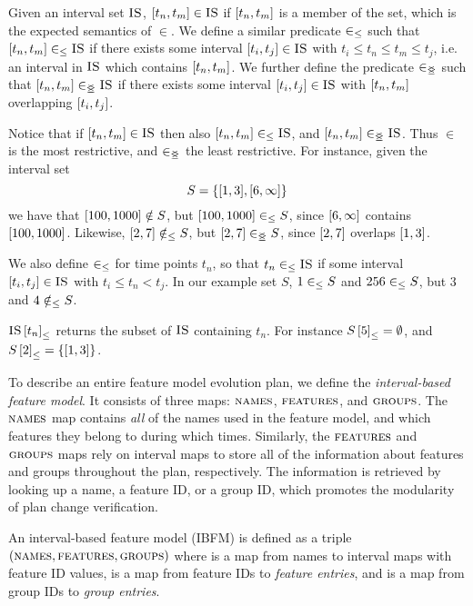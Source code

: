 Given an interval set $\textsc{IS}$, $\interval{t_n}{t_m} \in \map{IS}$ if $\interval{t_n}{t_m}$ is a member of the set, which is the expected semantics of $\in$. We define a similar predicate $\in_\leq$ such that $\interval{t_n}{t_m} \inn \map{IS}$ if there exists some interval $\interval{t_i}{t_j} \in \map{IS}$ with $t_i \leq t_n \leq t_m \leq t_j$, i.e. an interval in $\textsc{IS}$ which contains $\interval{t_n}{t_m}$. We further define the predicate $\in_{\leq\!\!\!\!\geq{}}$ such that $\interval{t_n}{t_m} \innr \map{IS}$ if there exists some interval $\interval{t_i}{t_j} \in \map{IS}$ with $\interval{t_n}{t_m}$ overlapping $\interval{t_i}{t_j}$. 

Notice that if $\interval{t_n}{t_m} \in \map{IS}$ then also $\interval{t_n}{t_m} \inn \map{IS}$, and $\interval{t_n}{t_m} \innr \map{IS}$. Thus $\in$ is the most restrictive, and $\in_{\leq\!\!\!\!\geq{}}$ the least restrictive.
For instance, given the interval set 
\[
  S = \set{\interval{1}{3}, \interval{6}{\forever}}
\]
we have that $\interval{100}{1000} \notin S$, but $\interval{100}{1000} \inn S$, since $\interval{6}{\forever}$ contains $\interval{100}{1000}$. Likewise,  $\interval{2}{7} \notinn S$, but $\interval{2}{7} \innr S$, since $\interval{2}{7}$ overlaps $\interval{1}{3}$.


We also define $\in_\leq$ for time points $t_n$, so that $t_n \in_\leq \textsc{IS}$ if some interval $\interval{t_i}{t_j} \in \map{IS}$ with $t_i \leq t_n < t_j$. In our example set $S$, $1 \in_\leq S$ and $256 \in_\leq S$, but $3$ and $4 \notin_\leq S$.

${\textsc{IS} \left[ t_n \right]}_{\leq}$ returns the subset of $\textsc{IS}$ containing $t_n$. For instance ${S \left[ 5 \right]}_{\leq} = \emptyset$, and $\containing{S}{2} = \set{\interval{1}{3}}$.

To describe an entire feature model evolution plan, we define the \emph{interval-based feature model}. It consists of three maps: $\textsc{names}{}$, $\textsc{features}{}$, and $\textsc{groups}{}{}$. The $\textsc{names}{}$ map contains \emph{all} of the names used in the feature model, and which features they belong to during which times. Similarly, the $\textsc{features}{}$ and $\textsc{groups}{}{}$ maps rely on interval maps to store all of the information about features and groups throughout the plan, respectively. The information is retrieved by looking up a name, a feature ID, or a group ID, which promotes the modularity of plan change verification.
\\

\begin{definition}
  An interval-based feature model (IBFM) is defined as a triple $(\textsc{names}, \textsc{features}, \textsc{groups}{})$ where \names{} is a map from names to interval maps with feature ID values, \features{} is a map from feature IDs to \emph{feature entries}, and \groups{} is a map from group IDs to \emph{group entries}. 
  \label{def:interval-based-feature-model}
\end{definition}

